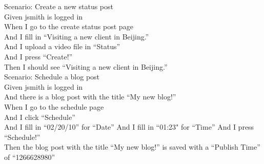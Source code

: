 \documentclass[12pt]{article}
\begin{document}
\begin{hangparas}{0.25in}{1}
  Scenario: Create a new status post \\
    Given jsmith is logged in \\
    When I go to the create status post page \\
    And I fill in ``Visiting a new client in Beijing.'' \\
    And I upload a video file in ``Status'' \\
    And I press ``Create!'' \\
    Then I should see ``Visiting a new client in Beijing.'' \\

  Scenario: Schedule a blog post \\
    Given jsmith is logged in \\
    And there is a blog post with the title ``My new blog!'' \\
    When I go to the schedule page \\
    And I click ``Schedule'' \\
    And I fill in ``02/20/10'' for ``Date''
    And I fill in ``01:23" for ``Time''
    And I press ``Schedule!'' \\
    Then the blog post with the title ``My new blog!'' is saved with a ``Publish Time'' of ``1266628980'' \\
\end{hangparas}
\end{document}
